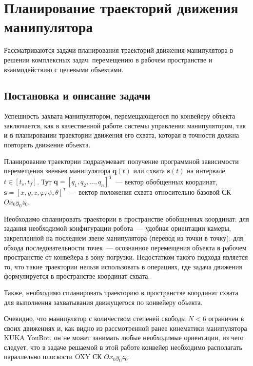 \section{Планирование траекторий движения манипулятора}\label{part_trajectory}

Рассматриваются задачи планирования траекторий движения манипулятора в  решении комплексных задач: перемещению в рабочем пространстве и взаимодействию с целевыми объектами.

\subsection{Постановка и описание задачи}

Успешность захвата манипулятором, перемещающегося по конвейеру объекта заключается, как в качественной работе системы управления манипулятором, так и в планировании траектории движения его схвата, которая в точности должна повторять движение объекта.

Планирование траектории подразумевает получение программной зависимости перемещения звеньев манипулятора $ \mathbf{q}(t) $ или схвата $ \mathbf{s}(t) $ на интервале $ t \in [t_s, t_f] $. Тут $ \mathbf{q} = [q_1, q_2, \dots, q_n]^T$~--- вектор обобщенных координат, $ \mathbf{s} = [x,y,z, \varphi, \psi, \theta]^T $~--- вектор положения схвата относительно базовой СК $ Ox_0y_0z_0 $.

Необходимо спланировать траектории в пространстве обобщенных координат: для задания необходимой конфигурации робота~--- удобная ориентации камеры, закрепленной на последнем звене манипулятора (перевод из точки в точку); для обхода последовательности точек~--- осознанное перемещения объекта в рабочем пространстве от конвейера в зону погрузки. Недостатком такого подхода является то, что такие траектории нельзя использовать в операциях, где задача движения формулируется в пространстве координат схвата.

Также, необходимо спланировать траекторию в пространстве координат схвата для выполнения захватывания движущегося по конвейеру объекта.

Очевидно, что манипулятор с количеством степеней свободы $ N < 6 $ ограничен в своих движениях и, как видно из рассмотренной ранее кинематики манипулятора KUKA YouBot, он не может занимать любые необходимые ориентации, из чего следует, что в задаче решаемой в этой работе конвейер необходимо располагать параллельно плоскости OXY СК $ Ox_{0}y_{0}z_{0} $.

